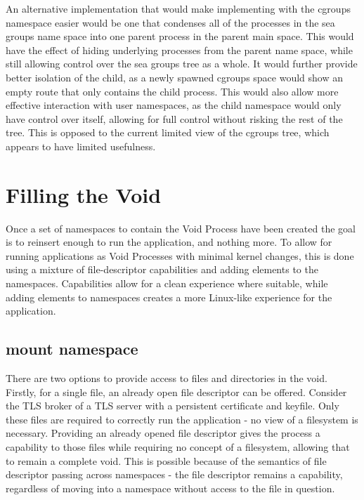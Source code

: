 \documentclass[a4paper,12pt,twoside,openright]{report}
\begin{document}
An alternative implementation that would make implementing with the cgroups namespace easier would be one that condenses all of the processes in the sea groups name space into one parent process in the parent main space. This would have the effect of hiding underlying processes from the parent name space, while still allowing control over the sea groups tree as a whole. It would further provide better isolation of the child, as a newly spawned cgroups space would show an empty route that only contains the child process. This would also allow more effective interaction with user namespaces, as the child namespace would only have control over itself, allowing for full control without risking the rest of the tree. This is opposed to the current limited view of the cgroups tree, which appears to have limited usefulness.

\chapter{Filling the Void}
\label{chap:filling-the-void}

Once a set of namespaces to contain the Void Process have been created the goal is to reinsert enough to run the application, and nothing more. To allow for running applications as Void Processes with minimal kernel changes, this is done using a mixture of file-descriptor capabilities and adding elements to the namespaces. Capabilities allow for a clean experience where suitable, while adding elements to namespaces creates a more Linux-like experience for the application.

\section{mount namespace}
\label{sec:filling-mount}

There are two options to provide access to files and directories in the void. Firstly, for a single file, an already open file descriptor can be offered. Consider the TLS broker of a TLS server with a persistent certificate and keyfile. Only these files are required to correctly run the application - no view of a filesystem is necessary. Providing an already opened file descriptor gives the process a capability to those files while requiring no concept of a filesystem, allowing that to remain a complete void. This is possible because of the semantics of file descriptor passing across namespaces - the file descriptor remains a capability, regardless of moving into a namespace without access to the file in question.
\end{document}
